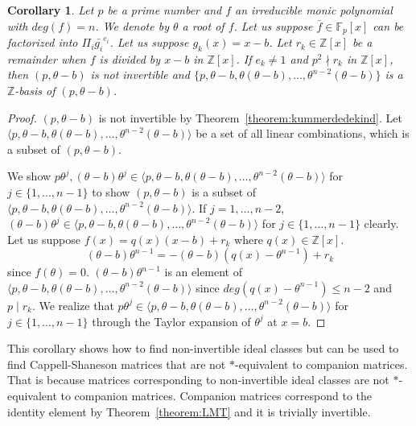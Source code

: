 \documentclass[12pt]{amsart}
\theoremstyle{plain}
\newtheorem{corollary}[theorem]{Corollary}
\theoremstyle{definition}
\theoremstyle{remark}
\renewcommand{\(}{\big(}
\renewcommand{\)}{\big)}
\theoremstyle{plain}
\theoremstyle{definition}
\begin{document}
    \begin{corollary}\label{corollary:sourceofinffamily}
    Let $p$ be a prime number and $f$ an irreducible monic polynomial with $deg(f) = n$. We denote by $\theta$ a root of $f$. Let us suppose $\bar{f} \in \mathbb{F}_p[x]$ can be factorized into $\Pi_i \bar{g_i}^{e_i}$. Let us suppose $g_k(x)=x-b$. Let $r_k \in \mathbb{Z}[x]$ be a remainder when $f$ is divided by $x - b$ in $\mathbb{Z}[x]$. If $e_k \neq 1$ and $p^2 \nmid r_k$ in $\mathbb{Z}[x]$, then $(p, \theta - b)$ is not invertible and $\{p, \theta - b, \theta ( \theta - b), \ldots , \theta^{n-2} (\theta - b)\}$ is a $\mathbb{Z}$-basis of $(p, \theta -b)$.
    \end{corollary}
    \begin{proof}
        $(p, \theta - b)$ is not invertible by Theorem~\ref{theorem:kummerdedekind}. Let $\langle p, \theta - b, \theta( \theta - b)  , \ldots , \theta^{n-2} (\theta - b) \rangle$ be a set of all linear combinations, which is a subset of $(p, \theta - b)$. 

        We show $p \theta^{j}, (\theta-b) \theta^{j} \in \langle p, \theta - b, \theta ( \theta - b), \ldots , \theta^{n-2} (\theta - b) \rangle$ for $j \in \{1, \ldots, n-1\}$ to show $(p, \theta - b)$ is a subset of $\langle p, \theta - b, \theta ( \theta - b), \ldots , \theta^{n-2} (\theta - b) \rangle$. If $j=1, \ldots , n-2$, $(\theta-b) \theta^{j} \in \langle p, \theta - b, \theta ( \theta - b), \ldots , \theta^{n-2} (\theta - b) \rangle$ for $j \in \{1, \ldots, n-1\}$ clearly. Let us suppose $f(x) = q(x)(x-b)+r_k$ where $q(x) \in \mathbb{Z}[x]$.
        \[
            (\theta -b) \theta^{n-1} = -(\theta - b)(q(x)-\theta^{n-1}) + r_k
        \] since $f(\theta)=0$. $(\theta - b) \theta^{n-1}$ is an element of $\langle p, \theta - b, \theta ( \theta - b), \ldots , \theta^{n-2} (\theta - b) \rangle$ since $deg(q(x)-\theta^{n-1}) \le n-2$ and $p\mid r_k$. We realize that $p \theta^{j} \in \langle p, \theta - b, \theta ( \theta - b), \ldots , \theta^{n-2} (\theta - b) \rangle$ for $j \in \{1, \ldots, n-1\}$ through the Taylor expansion of $\theta^j$ at $x=b$.
    \end{proof}

    This corollary shows how to find non-invertible ideal classes but can be used to find Cappell-Shaneson matrices that are not $*$-equivalent to companion matrices. That is because matrices corresponding to non-invertible ideal classes are not $*$-equivalent to companion matrices. Companion matrices correspond to the identity element by Theorem~\ref{theorem:LMT} and it is trivially invertible.
    
\end{document}
